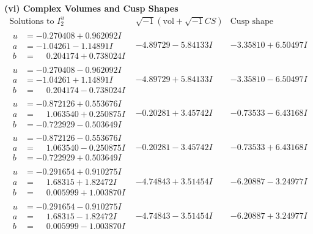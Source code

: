 \documentclass[1p]{elsarticle_modified}
\theoremstyle{definition}
\newcommand{\I}{\sqrt{-1}}
\begin{document}
\newpage\flushleft \textbf{(vi) Complex Volumes and Cusp Shapes}
$$\begin{array}{c|c|c}  
\text{Solutions to }I^u_{2}& \I (\text{vol} + \sqrt{-1}CS) & \text{Cusp shape}\\
 \hline 
\begin{aligned}
u &= -0.270408 + 0.962092 I \\
a &= -1.04261 - 1.14891 I \\
b &= \phantom{-}0.204174 + 0.738024 I\end{aligned}
 & -4.89729 - 5.84133 I & -3.35810 + 6.50497 I \\ \hline\begin{aligned}
u &= -0.270408 - 0.962092 I \\
a &= -1.04261 + 1.14891 I \\
b &= \phantom{-}0.204174 - 0.738024 I\end{aligned}
 & -4.89729 + 5.84133 I & -3.35810 - 6.50497 I \\ \hline\begin{aligned}
u &= -0.872126 + 0.553676 I \\
a &= \phantom{-}1.063540 + 0.250875 I \\
b &= -0.722929 - 0.503649 I\end{aligned}
 & -0.20281 + 3.45742 I & -0.73533 - 6.43168 I \\ \hline\begin{aligned}
u &= -0.872126 - 0.553676 I \\
a &= \phantom{-}1.063540 - 0.250875 I \\
b &= -0.722929 + 0.503649 I\end{aligned}
 & -0.20281 - 3.45742 I & -0.73533 + 6.43168 I \\ \hline\begin{aligned}
u &= -0.291654 + 0.910275 I \\
a &= \phantom{-}1.68315 + 1.82472 I \\
b &= \phantom{-}0.005999 + 1.003870 I\end{aligned}
 & -4.74843 + 3.51454 I & -6.20887 - 3.24977 I \\ \hline\begin{aligned}
u &= -0.291654 - 0.910275 I \\
a &= \phantom{-}1.68315 - 1.82472 I \\
b &= \phantom{-}0.005999 - 1.003870 I\end{aligned}
 & -4.74843 - 3.51454 I & -6.20887 + 3.24977 I \\ \hline\begin{aligned}

\end{aligned}
\end{array}$$
\end{document}
